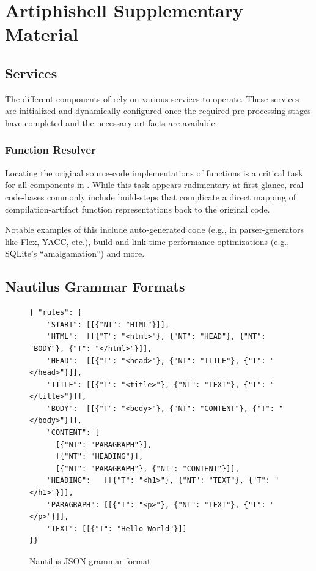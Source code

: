 \chapter{Artiphishell Supplementary Material}
\label{app:artiphishell}

\section{Services}
\label{app:artiphishell-services}

The different components of \artiphishell{} rely on various services to operate.
These services are initialized and dynamically configured once the required pre-processing stages have completed and the necessary artifacts are available.

\subsection{Function Resolver}
\label{app:function-resolver}

Locating the original source-code implementations of functions is a critical task for all components in \artiphishell{}.
While this task appears rudimentary at first glance, real code-bases commonly include build-steps that complicate a direct mapping of compilation-artifact function representations back to the original code.

Notable examples of this include auto-generated code (e.g., in parser-generators like Flex, YACC, etc.), build and link-time performance optimizations (e.g., SQLite's ``amalgamation'') and more.

\section{Nautilus Grammar Formats}
\label{app:nautilus-grammar-formats}

\begin{figure}[H]
\centering
\begin{lstlisting}[language={},basicstyle=\scriptsize\ttfamily,frame=single,breaklines=true]
{ "rules": {
    "START": [[{"NT": "HTML"}]],
    "HTML":  [[{"T": "<html>"}, {"NT": "HEAD"}, {"NT": "BODY"}, {"T": "</html>"}]],
    "HEAD":  [[{"T": "<head>"}, {"NT": "TITLE"}, {"T": "</head>"}]],
    "TITLE": [[{"T": "<title>"}, {"NT": "TEXT"}, {"T": "</title>"}]],
    "BODY":  [[{"T": "<body>"}, {"NT": "CONTENT"}, {"T": "</body>"}]],
    "CONTENT": [
      [{"NT": "PARAGRAPH"}],
      [{"NT": "HEADING"}],
      [{"NT": "PARAGRAPH"}, {"NT": "CONTENT"}]],
    "HEADING":   [[{"T": "<h1>"}, {"NT": "TEXT"}, {"T": "</h1>"}]],
    "PARAGRAPH": [[{"T": "<p>"}, {"NT": "TEXT"}, {"T": "</p>"}]],
    "TEXT": [[{"T": "Hello World"}]]
}}
\end{lstlisting}
\caption{Nautilus JSON grammar format}
\label{fig:grammar-format-json}
\end{figure}

